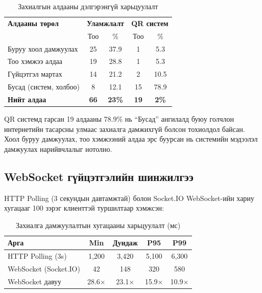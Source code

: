 \documentclass[12pt,a4paper]{article}
\begin{document}
\begin{table}[H]
\caption{Захиалгын алдааны дэлгэрэнгүй харьцуулалт}
\label{tab:errordetail}
\centering
\begin{tabularx}{\textwidth}{@{}p{4.8cm}cccc@{}}
\toprule
\textbf{Алдааны төрөл} & \multicolumn{2}{c}{\textbf{Уламжлалт}} & \multicolumn{2}{c}{\textbf{QR систем}} \\
 & Тоо & \% & Тоо & \% \\
\midrule
Буруу хоол дамжуулах    & 25 & 37.9 & 1 & 5.3 \\
Тоо хэмжээ алдаа        & 19 & 28.8 & 1 & 5.3 \\
Гүйцэтгэл мартах        & 14 & 21.2 & 2 & 10.5 \\
Бусад (систем, холбоо)  & 8  & 12.1 & 15 & 78.9 \\
\midrule
\textbf{Нийт алдаа}     & \textbf{66} & \textbf{23\%} & \textbf{19} & \textbf{2\%} \\
\bottomrule
\end{tabularx}
\end{table}

QR системд гарсан 19 алдааны 78.9\% нь ``Бусад'' ангилалд буюу
голчлон интернетийн тасарсны улмаас захиалга дамжихгүй болсон
тохиолдол байсан. Хоол буруу дамжуулах, тоо хэмжээний алдаа
эрс буурсан нь системийн мэдээлэл дамжуулах нарийвчлалыг нотолно.

\subsection{WebSocket гүйцэтгэлийн шинжилгээ}

HTTP Polling (3 секундын давтамжтай) болон Socket.IO WebSocket-ийн
хариу хугацааг 100 зэрэг клиенттэй туршилтаар хэмжсэн:

\begin{table}[H]
\caption{Захиалга дамжуулалтын хугацааны харьцуулалт (мс)}
\label{tab:wsdetail}
\centering
\begin{tabularx}{\textwidth}{@{}p{4cm}cccc@{}}
\toprule
\textbf{Арга} & \textbf{Min} & \textbf{Дундаж} & \textbf{P95} & \textbf{P99} \\
\midrule
HTTP Polling (3s) & 1,200 & 3,420 & 5,100 & 6,300 \\
WebSocket (Socket.IO) & 42 & 148 & 320 & 580 \\
\midrule
WebSocket давуу & 28.6$\times$ & 23.1$\times$ & 15.9$\times$ & 10.9$\times$ \\
\bottomrule
\end{tabularx}
\end{table}
\end{document}
